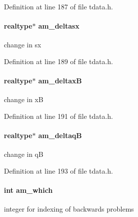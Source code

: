 Definition at line 187 of file tdata.\+h.

\hypertarget{struct_temp_data_a96e5e38eb662e4b1390a14693e17ece5}{}
\paragraph[{am\+\_\+deltasx}]{\setlength{\rightskip}{0pt plus 5cm}realtype$\ast$ am\+\_\+deltasx}\label{struct_temp_data_a96e5e38eb662e4b1390a14693e17ece5}
change in sx 

Definition at line 189 of file tdata.\+h.

\hypertarget{struct_temp_data_a75047d78cee16ec77b9aae2cf0a25964}{}
\paragraph[{am\+\_\+deltax\+B}]{\setlength{\rightskip}{0pt plus 5cm}realtype$\ast$ am\+\_\+deltax\+B}\label{struct_temp_data_a75047d78cee16ec77b9aae2cf0a25964}
change in x\+B 

Definition at line 191 of file tdata.\+h.

\hypertarget{struct_temp_data_adfe8df7debe43dd76c29e4976b1f1ae7}{}
\paragraph[{am\+\_\+deltaq\+B}]{\setlength{\rightskip}{0pt plus 5cm}realtype$\ast$ am\+\_\+deltaq\+B}\label{struct_temp_data_adfe8df7debe43dd76c29e4976b1f1ae7}
change in q\+B 

Definition at line 193 of file tdata.\+h.

\hypertarget{struct_temp_data_a961819e25ceef7e842c469cbedccb19f}{}
\paragraph[{am\+\_\+which}]{\setlength{\rightskip}{0pt plus 5cm}int am\+\_\+which}\label{struct_temp_data_a961819e25ceef7e842c469cbedccb19f}
integer for indexing of backwards problems 

